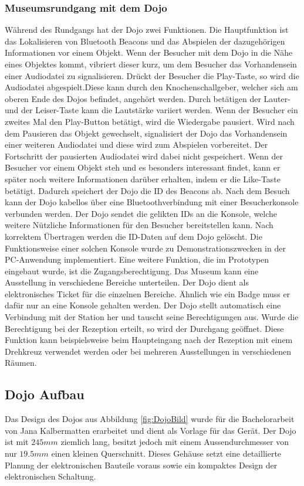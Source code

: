 \subsubsection{Museumsrundgang mit dem Dojo}
Während des Rundgangs hat der Dojo zwei Funktionen. Die Hauptfunktion ist das Lokalisieren von Bluetooth Beacons und das Abspielen der dazugehörigen Informationen vor einem Objekt. Wenn der Besucher mit dem Dojo in die Nähe eines Objektes kommt, vibriert dieser kurz, um dem Besucher das Vorhandensein einer Audiodatei zu signalisieren. Drückt der Besucher die Play-Taste, so wird die Audiodatei abgespielt.Diese kann durch den Knochenschallgeber, welcher sich am oberen Ende des Dojos befindet, angehört werden. Durch betätigen der Lauter- und der Leiser-Taste kann die Lautstärke variiert werden. Wenn der Besucher ein zweites Mal den Play-Button betätigt, wird die Wiedergabe pausiert.  Wird nach dem Pausieren das Objekt gewechselt, signalisiert der Dojo das Vorhandensein einer weiteren Audiodatei und diese wird zum Abspielen vorbereitet. Der Fortschritt der pausierten Audiodatei wird dabei nicht gespeichert. Wenn der Besucher vor einem Objekt steh und es besonders interessant findet, kann er später noch weitere Informationen darüber erhalten, indem er die Like-Taste betätigt. Dadurch speichert der Dojo die ID des Beacons ab. Nach dem Besuch kann der Dojo kabellos über eine Bluetoothverbindung mit einer Besucherkonsole verbunden werden. Der Dojo sendet die gelikten IDs an die Konsole, welche weitere Nützliche Informationen für den Besucher bereitstellen kann. Nach korrektem Übertragen werden die ID-Daten auf dem Dojo gelöscht. Die Funktionsweise einer solchen Konsole wurde zu Demonstrationszwecken in der PC-Anwendung implementiert.
Eine weitere Funktion, die im Prototypen eingebaut wurde, ist die Zugangsberechtigung. Das Museum kann eine Ausstellung in verschiedene Bereiche unterteilen. Der Dojo dient als elektronisches Ticket für die einzelnen Bereiche. Ähnlich wie ein Badge muss er dafür nur an eine Konsole gehalten werden. Der Dojo stellt automatisch eine Verbindung mit der Station her und tauscht seine Berechtigungen aus. Wurde die Berechtigung bei der Rezeption erteilt, so wird der Durchgang geöffnet. Diese Funktion kann beispielsweise beim Haupteingang nach der Rezeption mit einem Drehkreuz verwendet werden oder bei mehreren Ausstellungen in verschiedenen Räumen.
\clearpage
\subsection{Dojo Aufbau}
Das Design des Dojos aus Abbildung \ref{fig:DojoBild} wurde für die Bachelorarbeit von Jana Kalbermatten erarbeitet und dient als Vorlage für das Gerät. Der Dojo ist mit $245mm$ ziemlich lang, besitzt jedoch mit einem Aussendurchmesser von nur $19.5mm$ einen kleinen Querschnitt. Dieses Gehäuse setzt eine detaillierte Planung der elektronischen Bauteile voraus sowie ein kompaktes Design der elektronischen Schaltung.


